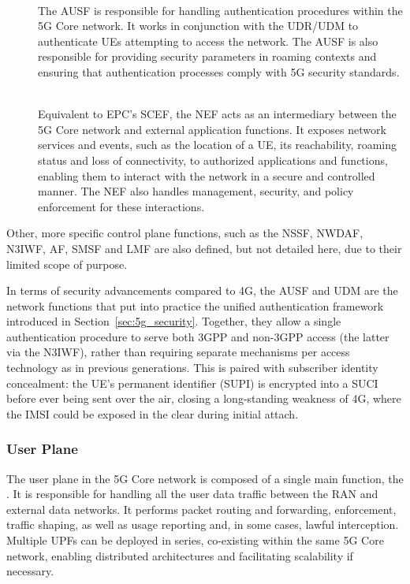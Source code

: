 \begin{description}
  \item[{\normalfont{}}]~\\
  The \gls{AUSF} is responsible for handling authentication procedures within the 5G Core network. It works in conjunction with the \gls{UDR}/\gls{UDM} to authenticate \glspl{UE}  attempting to access the network. The \gls{AUSF} is also responsible for providing security parameters in roaming contexts and ensuring that authentication processes comply with 5G security standards.
  \item[{\normalfont{}}]~\\
  Equivalent to \gls{EPC}'s \gls{SCEF}, the \gls{NEF} acts as an intermediary between the 5G Core network and external application functions. It exposes network services and events, such as the location of a \gls{UE}, its reachability, roaming status and loss of connectivity, to authorized applications and functions, enabling them to interact with the network in a secure and controlled manner. The \gls{NEF} also handles  management, security, and policy enforcement for these interactions.
\end{description}

Other, more specific control plane functions, such as the \gls{NSSF}, \gls{NWDAF}, \gls{N3IWF}, \gls{AF}, \gls{SMSF} and \gls{LMF} are also defined, but not detailed here, due to their limited scope of purpose.

In terms of security advancements compared to 4G, the \gls{AUSF} and \gls{UDM} are the network functions that put into practice the unified authentication framework introduced in Section~\ref{sec:5g_security}. Together, they allow a single authentication procedure to serve both \gls{3GPP} and non-\gls{3GPP} access (the latter via the \gls{N3IWF}), rather than requiring separate mechanisms per access technology as in previous generations. This is paired with subscriber identity concealment: the \gls{UE}'s permanent identifier (\gls{SUPI}) is encrypted into a \gls{SUCI} before ever being sent over the air, closing a long-standing weakness of 4G, where the \gls{IMSI} could be exposed in the clear during initial attach.

\subsubsection{User Plane}
\label{sec:user_plane}

The user plane in the 5G Core network is composed of a single main function, the . It is responsible for handling all the user data traffic between the \gls{RAN} and external data networks. It performs packet routing and forwarding,  enforcement, traffic shaping, as well as usage reporting and, in some cases, lawful interception. Multiple \glspl{UPF} can be deployed in series, co-existing within the same 5G Core network, enabling distributed architectures and facilitating scalability if necessary.

